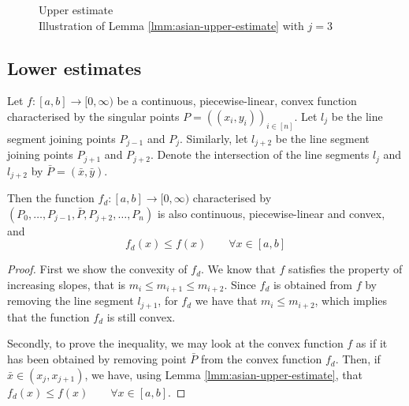 \begin{figure}[h]
	
	\caption{Upper estimate \\ Illustration of Lemma \ref{lmm:asian-upper-estimate} with $ j = 3 $}
	\label{fig:upper-estimate}
\end{figure}



\subsection{Lower estimates}
\label{subsec:asian-lower-estimates}

\begin{lmm}
	\label{lmm:asian-lower-estimate}
	Let $ f:[a,b] \to [0, \infty) $ be a continuous, piecewise-linear, convex function characterised by the singular points $ P = ( (x_i, y_i) )_{i \in [n]} $. Let $ l_{j} $ be the line segment joining points $ P_{j-1} $ and $ P_{j} $. Similarly, let $ l_{j+2} $ be the line segment joining points $ P_{j+1} $ and $ P_{j+2} $. Denote the intersection of the line segments $ l_{j} $ and $ l_{j+2} $ by $ \bar{P} = ( \bar{x}, \bar{y} ) $.
	
	Then the function $ f_d: [a,b] \to [0, \infty) $ characterised by $ (P_0, \dots, P_{j-1}, \bar{P}, P_{j+2}, \dots, P_n) $ is also continuous, piecewise-linear and convex, and
	\begin{equation}
		f_d(x) \le f(x) \qquad \forall x \in [a,b]
	\end{equation}
\end{lmm}

\begin{proof}
	First we show the convexity of $f_d$. We know that $f$ satisfies the property of increasing slopes, that is $ m_{i} \le m_{i+1} \le m_{i+2} $. Since $f_d$ is obtained from $f$ by removing the line segment $l_{j+1}$, for $f_d$ we have that $ m_{i} \le m_{i+2} $, which implies that the function $f_d$ is still convex.
	
	Secondly, to prove the inequality, we may look at the convex function $f$ as if it has been obtained by removing point $ \bar{P} $ from the convex function $f_d$. Then, if $ \bar{x} \in ( x_{j} , x_{j+1} ) $, we have, using Lemma \ref{lmm:asian-upper-estimate}, that $ f_d(x) \le f(x) \qquad \forall x \in [a,b] $.
\end{proof}

